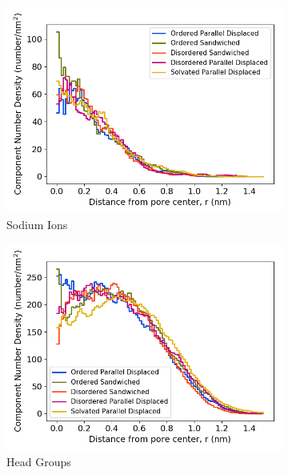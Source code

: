 \documentclass[journal=jpcbfk,manuscript=article]{achemso}
\begin{document}
  \begin{figure}[!htb]
  \centering
  \begin{subfigure}{0.32\textwidth}
        \includegraphics[width=1\linewidth]{sodium_density.png}
        \caption{Sodium Ions}
        \label{fig:sodium_regional_density}
  \end{subfigure}
  \begin{subfigure}{0.32\textwidth}
        \includegraphics[width=1\linewidth]{head_group_density.png}
        \caption{Head Groups}
        \label{fig:head_groups_regional_density}
  \end{subfigure}
  \begin{subfigure}{0.32\textwidth}

\end{subfigure}
\end{figure}
\end{document}
